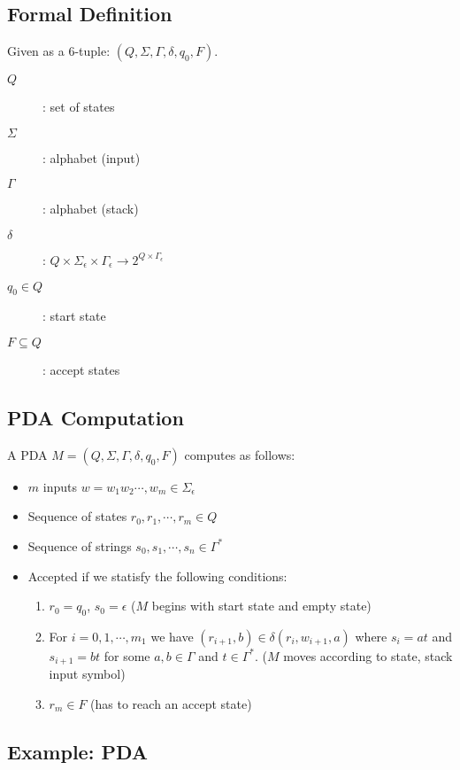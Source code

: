 \documentclass{article}
\begin{document}
\subsection*{Formal Definition}

Given as a 6-tuple: $(Q,\Sigma,\Gamma,\delta,q_0,F)$.

\begin{description}
\item[$Q$]: set of states
\item[$\Sigma$]: alphabet (input)
\item[$\Gamma$]: alphabet (stack)
\item[$\delta$]: $Q\times\Sigma_\epsilon\times\Gamma_\epsilon\rightarrow2^{Q\times\Gamma_\epsilon}$
\item[$q_0\in{}Q$]: start state
\item[$F\subseteq{}Q$]: accept states
\end{description}

\subsection*{PDA Computation}

A PDA $M=(Q,\Sigma,\Gamma,\delta,q_0,F)$ computes as follows:

\begin{itemize}
\item $m$ inputs $w=w_1w_2\cdots,w_m\in\Sigma_\epsilon$
\item Sequence of states $r_0,r_1,\cdots,r_m\in{}Q$
\item Sequence of strings $s_0,s_1,\cdots,s_n\in\Gamma^*$
\item Accepted if we statisfy the following conditions:
  \begin{enumerate}[label=(\arabic*)]
    \item $r_0=q_0$, $s_0=\epsilon$ ($M$ begins with start state and
      empty state)

    \item For $i=0,1,\cdots,m_1$ we have
      $(r_{i+1},b)\in\delta(r_i,w_{i+1},a)$ where $s_i=at$ and
      $s_{i+1}=bt$ for some $a,b\in\Gamma$ and $t\in\Gamma^*$. ($M$
      moves according to state, stack input symbol)

    \item $r_m\in{}F$ (has to reach an accept state)
  \end{enumerate}
\end{itemize}

\subsection*{Example: PDA}
\end{document}
